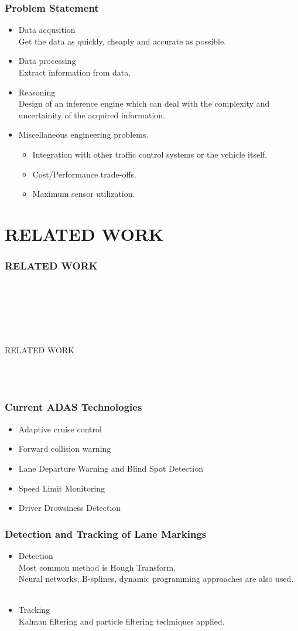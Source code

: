 \documentclass{beamer}
\newcommand{\mysectionpage}[2]{
	\begin{frame}
		\frametitle{#1}
		~\\~
		\begin{block}{}
			~\\~
			\begin{center}
				#2
			\end{center}
			~\\~
		\end{block}
	\end{frame}
}
\begin{document}
\frame
{
  \frametitle{Problem Statement}
  \begin{itemize}
  \item Data acqusition \\ {\scriptsize Get the data as quickly, cheaply and accurate as possible.}
  \item Data processing \\ {\scriptsize Extract information from data. }
  \item Reasoning \\ {\scriptsize Design of an inference engine which can deal with the complexity and uncertainity of the acquired information.}
  \item Miscellaneous engineering problems. 
	   \begin{itemize}
	  	 \item {\scriptsize Integration with other traffic control systems or the vehicle itself.}
	  	 \item {\scriptsize Cost/Performance trade-offs.}
	  	 \item {\scriptsize Maximum sensor utilization.}
	   \end{itemize}
	 \end{itemize}
}



\section{RELATED WORK}
\mysectionpage{RELATED WORK}{RELATED WORK}

\frame
{
	\frametitle{Current ADAS Technologies} 
	\begin{itemize}
		\item Adaptive cruise control 
		\item Forward collision warning 
		\item Lane Departure Warning and Blind Spot Detection 
		\item Speed Limit Monitoring 
		\item Driver Drowsiness Detection
	\end{itemize}
}

\frame
{
  \frametitle{Detection and Tracking of Lane Markings}
		  \begin{itemize}
	  	  \item Detection \\ 	
	  				Most common method is Hough Transform. \\
						Neural networks, B-splines, dynamic programming approaches are also used. \\ ~
	  	  \item Tracking \\
						Kalman filtering and particle filtering techniques applied.  	
	    \end{itemize}
}
\end{document}
